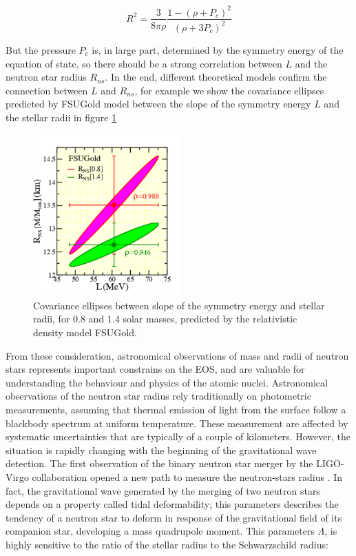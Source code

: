 \begin{equation}
R^{2} = \dfrac{3}{8\pi \rho} \dfrac{1 - (\rho + P_{c})^{2}}{(\rho + 3 P_{c})^{2}}
\end{equation}

But the pressure $P_{c}$ is, in large part, determined by the symmetry energy of the equation of state, so there should be a strong correlation between $L$ and the neutron star radius $R_{ns}$. In the end, different theoretical models \cite{PhysRevLett.95.122501} confirm the connection between $L$ and $R_{ns}$, for example we show the covariance ellipses predicted by FSUGold model between the slope of the symmetry energy $L$ and the stellar radii in figure \ref{fig:LvsRns}

\begin{figure}[hbtp]
\centering
\includegraphics[width = 0.5\textwidth]{Introduzione/LvsRns.pdf}
\caption{Covariance ellipses between slope of the symmetry energy and stellar radii, for $0.8$ and $1.4$ solar masses, predicted by the relativistic density model FSUGold.}
\label{fig:LvsRns}
\end{figure}

From these consideration, astronomical observations of mass and radii of neutron stars represents important constrains on the EOS, and are valuable for understanding the behaviour and physics of the atomic nuclei.
Astronomical observations of the neutron star radius rely traditionally on photometric measurements, assuming that thermal emission of light from the surface follow a blackbody spectrum at uniform temperature. These measurement are affected by systematic uncertainties that are typically of a couple of kilometers.
However, the situation is rapidly changing with the beginning of the gravitational wave detection. The first observation of the binary neutron star merger by the LIGO-Virgo collaboration opened a new path to measure the neutron-stars radius \cite{LIGOScientific:2017vwq}. In fact, the gravitational wave generated by the merging of two neutron stars depends on a property called tidal deformability; this parameters describes the tendency of a neutron star to deform in response of the gravitational field of its companion star, developing a mass quadrupole moment. This parameters $\Lambda$, is highly sensitive to the ratio of the stellar radius to the Schwarzschild radius:

